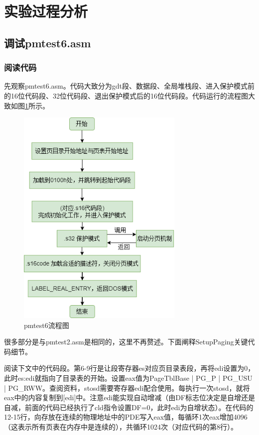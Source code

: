 \documentclass[UTF8,12pt]{ctexart}
\begin{document}
    
    \section{实验过程分析}
    \subsection{调试pmtest6.asm}
    \subsubsection{阅读代码}
    先观察pmtest6.asm。代码大致分为gdt段、数据段、全局堆栈段、进入保护模式前的16位代码段、32位代码段、退出保护模式后的16位代码段。代码运行的流程图大致如图\ref{pmtest6}所示。
    \begin{figure}[ht]
        \centering
        \includegraphics[width=8cm]{images/pmtest6.png}
        \caption{pmtest6流程图}
        \label{pmtest6}
    \end{figure}
    
    很多部分是与pmtest2.asm是相同的，这里不再赘述。下面阐释SetupPaging关键代码细节。
    
    阅读下文中的代码段。第6-9行是让段寄存器es对应页目录表段，再将edi设置为0，此时es:edi就指向了目录表的开始。设置eax值为PageTblBase | PG\_P | PG\_USU |  PG\_RWW。查阅资料，stosd需要寄存器edi配合使用。每执行一次stosd，就将eax中的内容复制到[edi]中。注意edi能实现自动增减（由DF标志位决定是自增还是自减，前面的代码已经执行了cld指令设置DF=0，此时edi为自增状态）。在代码的12-15行，向存放在连续的物理地址中的PDE写入eax值，每循环1次eax增加4096（这表示所有页表在内存中是连续的），共循环1024次（对应代码的第8行）。
    
\end{document}
